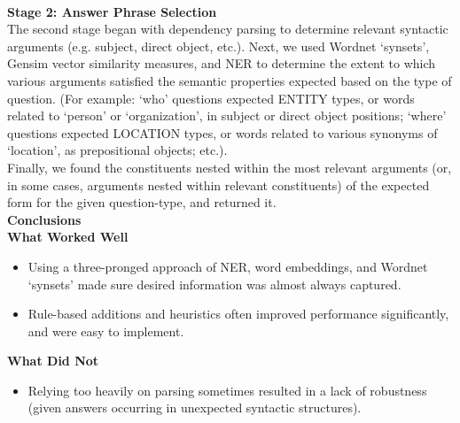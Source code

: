 \documentclass[a1,landscape]{a0poster}
\begin{document}
\begin{multicols}{3}
\textbf{\LARGE \\Stage 2: Answer Phrase Selection}\\
The second stage began with dependency parsing to determine relevant syntactic arguments (e.g. subject, direct object, etc.). Next, we used Wordnet `synsets', Gensim vector similarity measures, and NER to determine the extent to which various arguments satisfied the semantic properties expected based on the type of question. (For example: `who' questions expected ENTITY types, or words related to `person' or `organization', in subject or direct object positions; `where' questions expected LOCATION types, or words related to various synonyms of `location', as prepositional objects; etc.). \\
Finally, we found the constituents nested within the most relevant arguments (or, in some cases, arguments nested within relevant constituents) of the expected form for the given question-type, and returned it.
\color{SaddleBrown} %
\textbf{\LARGE\\Conclusions}\\
\textbf{What Worked Well}
\begin{itemize}
    \item Using a three-pronged approach of NER, word embeddings, and Wordnet `synsets' made sure desired information was almost always captured.
    \item Rule-based additions and heuristics often improved performance significantly, and were easy to implement. 
\end{itemize}
\vspace{0.7em}
\textbf{What Did Not}
\begin{itemize}
    \item Relying too heavily on parsing sometimes resulted in a lack of robustness (given answers occurring in unexpected syntactic structures).
\end{itemize}
\end{multicols}
\color{DarkSlateGray} %
\nocite{*} %


\end{document}
